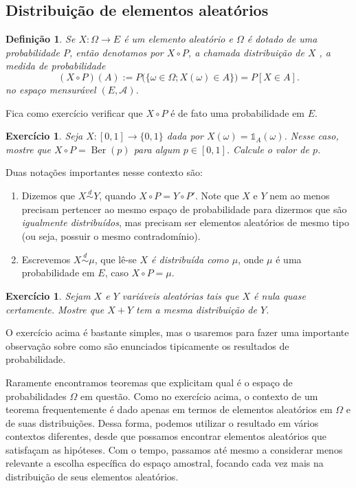 \documentclass[reqno, draft]{book}
\newcommand*\1{\mathds{1}}
\newtheorem{definition}[theorem]{Definição}
\newtheorem{exercise}[example]{Exercício}
\DeclareMathOperator{\Ber}{Ber}
\def \distr{\overset{d}{\sim}}
\begin{document}
\subsection{Distribuição de elementos aleatórios}

\begin{definition}
  Se $X:\Omega \to E$ é um elemento aleatório e $\Omega$ é dotado de uma probabilidade $P$, então denotamos por $X \circ P$, a chamada \emph{distribuição de $X$} , a medida de probabilidade
  \begin{equation}
    (X \circ P)(A) := P\big( \{\omega \in \Omega; X(\omega) \in A\} \big) = P[X \in A].
  \end{equation}
  no espaço mensurável $(E,\mathcal{A})$.
\end{definition}

Fica como exercício verificar que $X \circ P$ é de fato uma probabilidade em $E$.

\begin{exercise}
  Seja $X:[0,1] \to \{0,1\}$ dada por $X(\omega) = \1_A (\omega)$.
  Nesse caso, mostre que $X \circ P = \Ber(p)$ para algum $p \in [0,1]$.
  Calcule o valor de $p$.
\end{exercise}

Duas notações importantes nesse contexto são:
\begin{enumerate}[\quad a)]
\item Dizemos que $X \distr Y$, \index{X d Y@$X \distr Y$} quando $X \circ P = Y \circ P'$.
Note que $X$ e $Y$ nem ao menos precisam pertencer ao mesmo espaço de probabilidade para dizermos que são \emph{igualmente distribuídos}, mas precisam ser elementos aleatórios de mesmo tipo (ou seja, possuir o mesmo contradomínio).
\item Escrevemos $X \distr \mu$, \index{X d mu@$X \distr \mu$} que lê-se \emph{$X$ é distribuída como $\mu$}, onde $\mu$ é uma probabilidade em $E$, caso $X \circ P = \mu$.
\end{enumerate}

\begin{exercise}
  Sejam $X$ e $Y$ variáveis aleatórias tais que $X$ é nula quase certamente.
  Mostre que $X + Y$ tem a mesma distribuição de $Y$.
\end{exercise}

O exercício acima é bastante simples, mas o usaremos para fazer uma importante observação sobre como são enunciados tipicamente os resultados de probabilidade.

Raramente encontramos teoremas que explicitam qual é o espaço de probabilidades $\Omega$ em questão.
Como no exercício acima, o contexto de um teorema frequentemente é dado apenas em termos de elementos aleatórios em $\Omega$ e de suas distribuições.
Dessa forma, podemos utilizar o resultado em vários contextos diferentes, desde que possamos encontrar elementos aleatórios que satisfaçam as hipóteses.
Com o tempo, passamos até mesmo a considerar menos relevante a escolha específica do espaço amostral, focando cada vez mais na distribuição de seus elementos aleatórios.
\end{document}
